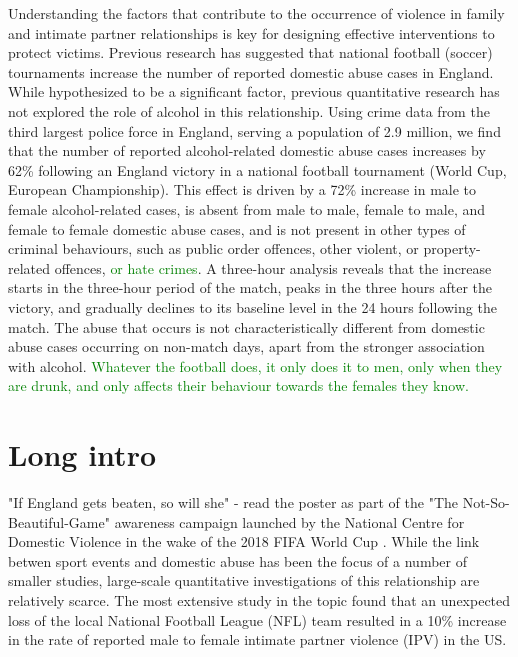 \documentclass[12pt, letterpaper]{article}
\newcommand{\NS}[1] {{\textcolor{green}{#1}}}
\begin{document}
Understanding the factors that contribute to the occurrence of violence in family and intimate partner relationships is key for designing effective interventions to protect victims. Previous research has suggested that national football (soccer) tournaments increase the number of reported domestic abuse cases in England\autocite{Kirby2014, Brimicombe2012}. While hypothesized to be a significant factor, previous quantitative research has not explored the role of alcohol in this relationship. Using crime data from the third largest police force in England, serving a population of 2.9 million\autocite{populationfigure}, we find that the number of reported alcohol-related domestic abuse cases increases by 62\% following an England victory in a national football tournament (World Cup, European Championship). This effect is driven by a 72\% increase in male to female alcohol-related cases, is absent from male to male, female to male, and female to female domestic abuse cases, and is not present in other types of criminal behaviours, such as public order offences, other violent, or property-related offences, \NS{or hate crimes}. A three-hour analysis reveals that the increase starts in the three-hour period of the match, peaks in the three hours after the victory, and gradually declines to its baseline level in the 24 hours following the match. The abuse that occurs is not characteristically different from domestic abuse cases occurring on non-match days, apart from the stronger association with alcohol. \NS{Whatever the football does, it only does it to men, only when they are drunk, and only affects their behaviour towards the females they know.}


\section{Long intro}

"If England gets beaten, so will she" - read the poster as part of the "The Not-So-Beautiful-Game" awareness campaign launched by the National Centre for Domestic Violence in the wake of the 2018 FIFA World Cup \autocite{NCDV}. While the link betwen sport events and domestic abuse has been the focus of a number of smaller studies\autocite{Williams2014}, large-scale quantitative investigations of this relationship are relatively scarce. The most extensive study in the topic found that an unexpected loss of the local National Football League (NFL) team resulted in a 10\% increase in the rate of reported male to female intimate partner violence (IPV) in the US\autocite{Card2011}. 
\end{document}
